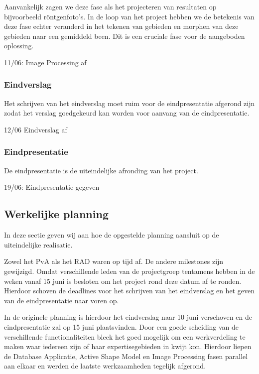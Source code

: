 Aanvankelijk zagen we deze fase als het projecteren van resultaten op
bijvoorbeeld r\"{o}ntgenfoto's. In de loop van het project hebben we de
betekenis van deze fase echter veranderd in het tekenen van gebieden en
morphen van deze gebieden naar een gemiddeld been. Dit is een cruciale fase
voor de aangeboden oplossing.

11/06: Image Processing af

\subsubsection{Eindverslag}

Het schrijven van het eindverslag moet ruim voor de eindpresentatie afgerond
zijn zodat het verslag goedgekeurd kan worden voor aanvang van de eindpresentatie.

12/06 Eindverslag af

\subsubsection{Eindpresentatie}

De eindpresentatie is de uiteindelijke afronding van het project.

19/06: Eindpresentatie gegeven

\subsection{Werkelijke planning}
\label{werkelijke_planning}

In deze sectie geven wij aan hoe de opgestelde planning aansluit op de
uiteindelijke realisatie.

Zowel het PvA als het RAD waren op tijd af. De andere milestones zijn
gewijzigd. Omdat verschillende leden van de projectgroep tentamens
hebben in de weken vanaf 15 juni is besloten om het project rond deze datum af
te ronden. Hierdoor schoven de deadlines voor het schrijven van het eindverslag
en het geven van de eindpresentatie naar voren op.

In de originele planning is hierdoor het eindverslag naar 10 juni verschoven en de eindpresentatie zal op 15 juni plaatsvinden.  Door een goede scheiding van de
verschillende functionaliteiten bleek het goed mogelijk om een werkverdeling te
maken waar iedereen zijn of haar expertisegebieden in kwijt kon. Hierdoor
liepen de Database Applicatie, Active Shape Model en Image Processing fasen
parallel aan elkaar en werden de laatste werkzaamheden tegelijk afgerond.

